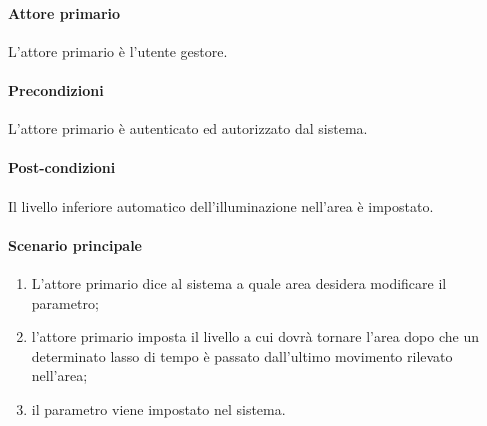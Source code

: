 \paragraph{Attore primario} L'attore primario è l'utente gestore.
\paragraph{Precondizioni}  L'attore primario è autenticato ed autorizzato dal sistema.
\paragraph{Post-condizioni} Il livello inferiore automatico dell'illuminazione nell'area è impostato.
\paragraph{Scenario principale}
\begin{enumerate}
    \item L'attore primario dice al sistema a quale area desidera modificare il parametro;
    \item l'attore primario imposta il livello a cui dovrà tornare l'area dopo che un determinato lasso di tempo è passato dall'ultimo movimento rilevato nell'area;
    \item il parametro viene impostato nel sistema.
\end{enumerate}
